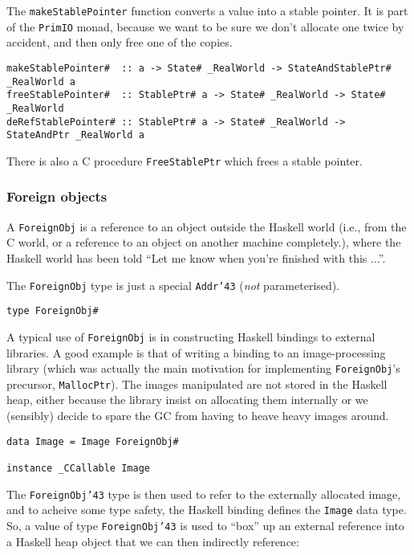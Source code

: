The \mbox{\tt makeStablePointer} function converts a value into a stable pointer.
It is part of the \mbox{\tt PrimIO} monad, because we want to be sure we don't
allocate one twice by accident, and then only free one of the copies.
\begin{verbatim}
makeStablePointer#  :: a -> State# _RealWorld -> StateAndStablePtr# _RealWorld a
freeStablePointer#  :: StablePtr# a -> State# _RealWorld -> State# _RealWorld
deRefStablePointer# :: StablePtr# a -> State# _RealWorld -> StateAndPtr _RealWorld a
\end{verbatim}
There is also a C procedure \mbox{\tt FreeStablePtr} which frees a stable pointer.

%
%
\subsubsection{Foreign objects}

A \mbox{\tt ForeignObj} is a reference to an object outside the Haskell
world (i.e., from the C world, or a reference to an object on another
machine completely.), where the Haskell world has been told ``Let me
know when you're finished with this ...''.

The \mbox{\tt ForeignObj} type is just a special \mbox{\tt Addr{\char'43}} ({\em not} parameterised).
\begin{verbatim}
type ForeignObj#
\end{verbatim}

A typical use of \mbox{\tt ForeignObj} is in constructing Haskell bindings
to external libraries. A good example is that of writing a binding to
an image-processing library (which was actually the main motivation
for implementing \mbox{\tt ForeignObj}'s precursor, \mbox{\tt MallocPtr}). The
images manipulated are not stored in the Haskell heap, either because
the library insist on allocating them internally or we (sensibly)
decide to spare the GC from having to heave heavy images around.

\begin{verbatim}
data Image = Image ForeignObj#

instance _CCallable Image
\end{verbatim}

The \mbox{\tt ForeignObj{\char'43}} type is then used to refer to the externally
allocated image, and to acheive some type safety, the Haskell binding
defines the \mbox{\tt Image} data type. So, a value of type \mbox{\tt ForeignObj{\char'43}} is
used to ``box'' up an external reference into a Haskell heap object
that we can then indirectly reference:

